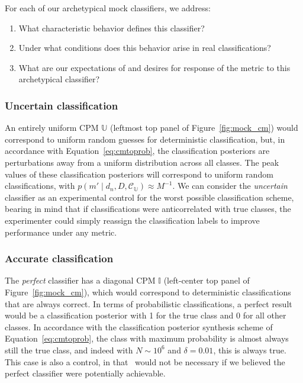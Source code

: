 For each of our archetypical mock classifiers, we address:
\begin{enumerate}
  \item What characteristic behavior defines this classifier?
  \item Under what conditions does this behavior arise in real classifications?
  \item What are our expectations of and desires for response of the metric to this archetypical classifier?
\end{enumerate}

\subsubsection{Uncertain classification}
\label{sec:uncertaindata}

An entirely uniform CPM $\mathbb{U}$ (leftmost top panel of Figure~\ref{fig:mock_cm}) would correspond to uniform random guesses for deterministic classification, but, in accordance with Equation~\ref{eq:cmtoprob}, the classification posteriors are perturbations away from a uniform distribution across all classes.
The peak values of these classification posteriors will correspond to uniform random classifications, with $p(m' \mid d_{n}, D, \mathcal{C}_{\mathbb{U}}) \approx M^{-1}$.
We can consider the \textit{uncertain} classifier as an experimental control for the worst possible classification scheme, bearing in mind that if classifications were anticorrelated with true classes, the experimenter could simply reassign the classification labels to improve performance under any metric.

\subsubsection{Accurate classification}
\label{sec:accuratedata}

The \textit{perfect} classifier has a diagonal CPM $\mathbb{I}$ (left-center top panel of Figure~\ref{fig:mock_cm}), which would correspond to deterministic classifications that are always correct.
In terms of probabilistic classifications, a perfect result would be a classification posterior with 1 for the true class and 0 for all other classes.
In accordance with the classification posterior synthesis scheme of Equation~\ref{eq:cmtoprob}, the class with maximum probability is almost always still the true class, and indeed with $N \sim 10^{6}$ and $\delta = 0.01$, this is always true.
This case is also a control, in that \plasticc\ would not be necessary if we believed the perfect classifier were potentially achievable.

